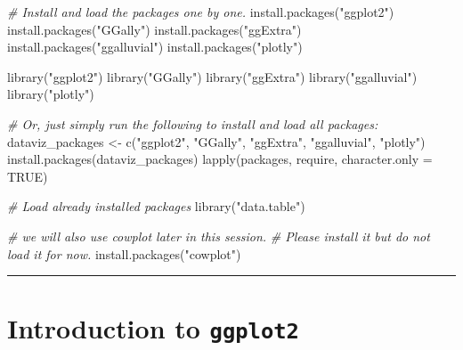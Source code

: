 \documentclass[
]{book}
\newenvironment{Shaded}{\begin{snugshade}}{\end{snugshade}}
\newcommand{\AttributeTok}[1]{\textcolor[rgb]{0.77,0.63,0.00}{#1}}
\newcommand{\CommentTok}[1]{\textcolor[rgb]{0.56,0.35,0.01}{\textit{#1}}}
\newcommand{\ConstantTok}[1]{\textcolor[rgb]{0.00,0.00,0.00}{#1}}
\newcommand{\FunctionTok}[1]{\textcolor[rgb]{0.00,0.00,0.00}{#1}}
\newcommand{\NormalTok}[1]{#1}
\newcommand{\OtherTok}[1]{\textcolor[rgb]{0.56,0.35,0.01}{#1}}
\newcommand{\StringTok}[1]{\textcolor[rgb]{0.31,0.60,0.02}{#1}}
\begin{document}
\begin{Shaded}
\begin{Highlighting}[]
\CommentTok{\# Install and load the packages one by one.}
\FunctionTok{install.packages}\NormalTok{(}\StringTok{"ggplot2"}\NormalTok{)}
\FunctionTok{install.packages}\NormalTok{(}\StringTok{"GGally"}\NormalTok{)}
\FunctionTok{install.packages}\NormalTok{(}\StringTok{"ggExtra"}\NormalTok{)}
\FunctionTok{install.packages}\NormalTok{(}\StringTok{"ggalluvial"}\NormalTok{)}
\FunctionTok{install.packages}\NormalTok{(}\StringTok{"plotly"}\NormalTok{)}

\FunctionTok{library}\NormalTok{(}\StringTok{"ggplot2"}\NormalTok{)}
\FunctionTok{library}\NormalTok{(}\StringTok{"GGally"}\NormalTok{)}
\FunctionTok{library}\NormalTok{(}\StringTok{"ggExtra"}\NormalTok{)}
\FunctionTok{library}\NormalTok{(}\StringTok{"ggalluvial"}\NormalTok{)}
\FunctionTok{library}\NormalTok{(}\StringTok{"plotly"}\NormalTok{)}

\CommentTok{\# Or, just simply run the following to install and load all packages:}
\NormalTok{dataviz\_packages }\OtherTok{\textless{}{-}} \FunctionTok{c}\NormalTok{(}\StringTok{"ggplot2"}\NormalTok{, }\StringTok{"GGally"}\NormalTok{, }\StringTok{"ggExtra"}\NormalTok{, }\StringTok{"ggalluvial"}\NormalTok{, }\StringTok{"plotly"}\NormalTok{)}
\FunctionTok{install.packages}\NormalTok{(dataviz\_packages)}
\FunctionTok{lapply}\NormalTok{(packages, require, }\AttributeTok{character.only =} \ConstantTok{TRUE}\NormalTok{)}

\CommentTok{\# Load already installed packages}
\FunctionTok{library}\NormalTok{(}\StringTok{"data.table"}\NormalTok{)}

\CommentTok{\# we will also use cowplot later in this session.}
\CommentTok{\# Please install it but do not load it for now.}
\FunctionTok{install.packages}\NormalTok{(}\StringTok{"cowplot"}\NormalTok{)}
\end{Highlighting}
\end{Shaded}

\begin{center}\rule{0.5\linewidth}{0.5pt}\end{center}

\hypertarget{introduction-to-ggplot2}{%
\section{\texorpdfstring{Introduction to \texttt{ggplot2}}{Introduction to ggplot2}}\label{introduction-to-ggplot2}}
\end{document}
